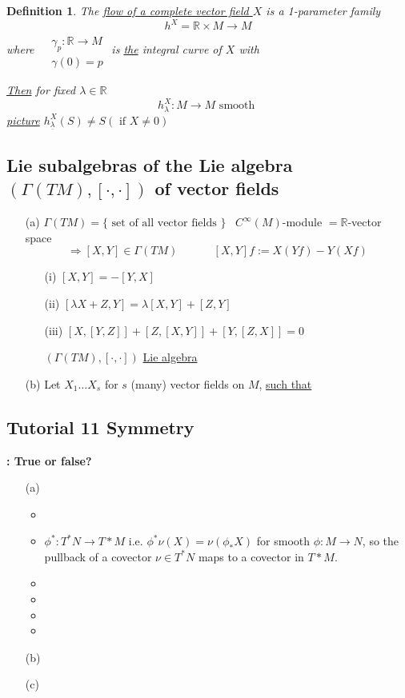 \documentclass[10pt, twoside]{amsart}
\newtheorem{definition}{Definition}
\newcommand{\exercisehead}[1]
  { \smallskip
   \noindent{\small\bf Exercise #1.}
  }
\begin{document}
\begin{multicols*}{2}
\begin{definition} The \underline{flow of a complete vector field $X$} is a 1-parameter family
\[
h^X = \mathbb{R}\times M \to M
\]
where $\begin{aligned} & \quad \\ 
  & \gamma_p : \mathbb{R} \to M \\
  & \gamma(0) = p \end{aligned}$ is \underline{the} integral curve of $X$ with 

\underline{Then} for fixed $\lambda \in \mathbb{R}$ 
\[
h_{\lambda}^X : M \to M \text{ smooth }
\]
\underline{picture}  $h^X_{\underline{\lambda}}(S) \neq S (\text{ if } X \neq 0 )$
\end{definition}

\subsection{Lie subalgebras of the Lie algebra $(\Gamma(TM) , [ \cdot , \cdot ] )$ of vector fields}

\begin{enumerate}
  \item[(a)] $\Gamma(TM) = \lbrace \text{ set of all vector fields } \rbrace$ \quad \, $C^{\infty}(M)$-module $ = \mathbb{R}$-vector space \[
\Longrightarrow [X,Y] \in \Gamma(TM) \quad \quad \quad \, [X,Y] f := X(Yf) - Y(Xf)
\]
\begin{enumerate}
\item[(i)] $[X,Y] = -[Y,X]$ 
\item[(ii)] $[\lambda X + Z, Y] = \lambda [X,Y] + [Z,Y]$
\item[(iii)] $[X,[Y,Z]]  + [Z,[X,Y]] + [Y,[Z,X]] =0$ 

$(\Gamma(TM), [\cdot, \cdot])$ \underline{Lie algebra}
\end{enumerate}
\item[(b)] Let $X_1\dots X_s$ for $s$ (many) vector fields on $M$, \underline{such that}
\end{enumerate}

\subsection*{Tutorial 11 Symmetry }

\exercisehead{1}\textbf{: True or false?}

\begin{enumerate}
\item[(a)]
\begin{itemize}
\item
\item $\phi^*:T^*N \to T*M$ i.e. $\phi^*\nu(X) = \nu(\phi_*X)$ for smooth $\phi:M \to N$, so the pullback of a covector $\nu \in T^*N$ maps to a covector in $T*M$.  
\item
\item
\item
\item
\end{itemize}
\item[(b)]
\item[(c)]
\end{enumerate}


\end{multicols*}
\end{document}

